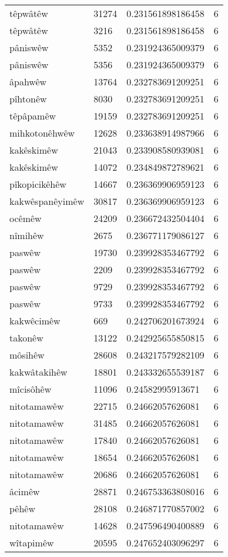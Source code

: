 \begin{longtable}{llll}
têpwâtêw & 31274 & 0.231561898186458 & 6\\
têpwâtêw & 3216 & 0.231561898186458 & 6\\
pâniswêw & 5352 & 0.231924365009379 & 6\\
pâniswêw & 5356 & 0.231924365009379 & 6\\
âpahwêw & 13764 & 0.232783691209251 & 6\\
pîhtonêw & 8030 & 0.232783691209251 & 6\\
têpâpamêw & 19159 & 0.232783691209251 & 6\\
mihkotonêhwêw & 12628 & 0.233638914987966 & 6\\
kakêskimêw & 21043 & 0.233908580939081 & 6\\
kakêskimêw & 14072 & 0.234849872789621 & 6\\
pîkopicikêhêw & 14667 & 0.236369906959123 & 6\\
kakwêspanêyimêw & 30817 & 0.236369906959123 & 6\\
ocêmêw & 24209 & 0.236672432504404 & 6\\
nîmihêw & 2675 & 0.236771179086127 & 6\\
paswêw & 19730 & 0.239928353467792 & 6\\
paswêw & 2209 & 0.239928353467792 & 6\\
paswêw & 9729 & 0.239928353467792 & 6\\
paswêw & 9733 & 0.239928353467792 & 6\\
kakwêcimêw & 669 & 0.242706201673924 & 6\\
takonêw & 13122 & 0.242925655850815 & 6\\
môsihêw & 28608 & 0.243217579282109 & 6\\
kakwâtakihêw & 18801 & 0.243332655539187 & 6\\
mîcisôhêw & 11096 & 0.24582995913671 & 6\\
nitotamawêw & 22715 & 0.24662057626081 & 6\\
nitotamawêw & 31485 & 0.24662057626081 & 6\\
nitotamawêw & 17840 & 0.24662057626081 & 6\\
nitotamawêw & 18654 & 0.24662057626081 & 6\\
nitotamawêw & 20686 & 0.24662057626081 & 6\\
âcimêw & 28871 & 0.246753363808016 & 6\\
pêhêw & 28108 & 0.246871770857002 & 6\\
nitotamawêw & 14628 & 0.247596490400889 & 6\\
wîtapimêw & 20595 & 0.247652403096297 & 6\\

\end{longtable}
